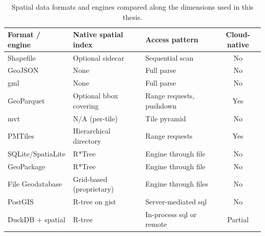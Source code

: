 \begin{table}[H]
    \centering
    \footnotesize
    \setlength{\tabcolsep}{6pt}
    \renewcommand{\arraystretch}{1.2}
    \begin{tabularx}{\textwidth}{@{}l L L c@{}}
        \toprule
        \textbf{Format / engine} & \textbf{Native spatial index} & \textbf{Access pattern} & \textbf{Cloud-native} \\
        \midrule
        Shapefile         & Optional sidecar           & Sequential scan                       & No      \\
        GeoJSON           & None                       & Full parse                            & No      \\
        \acrshort{gml}    & None                       & Full parse                            & No      \\
        GeoParquet        & Optional bbox covering     & Range requests, pushdown              & Yes     \\
        \acrshort{mvt}    & N/A (per-tile)             & Tile pyramid                          & No     \\
        PMTiles           & Hierarchical directory     & Range requests                        & Yes     \\
        \midrule
        SQLite/SpatiaLite & R*Tree                     & Engine through file                   & No      \\
        GeoPackage        & R*Tree                     & Engine through file                   & No      \\
        File Geodatabase  & Grid-based (proprietary)   & Engine through files                  & No      \\
        \midrule
        PostGIS           & R-tree on \acrshort{gist}  & Server-mediated \acrshort{sql}        & No      \\
        DuckDB + spatial  & R-tree                     & In-process \acrshort{sql} or remote   & Partial \\
        \bottomrule
    \end{tabularx}
    \caption[Summary of spatial data formats and engines.]{Spatial data formats and engines compared along the dimensions used in this thesis.}
    \label{tab:format-summary}
\end{table}